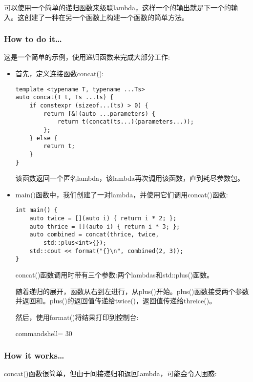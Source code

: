 
可以使用一个简单的递归函数来级联lambda，这样一个的输出就是下一个的输入。这创建了一种在另一个函数上构建一个函数的简单方法。

\subsubsection{How to do it…}

这是一个简单的示例，使用递归函数来完成大部分工作:

\begin{itemize}
\item 
首先，定义连接函数concat():

\begin{lstlisting}[style=styleCXX]
template <typename T, typename ...Ts>
auto concat(T t, Ts ...ts) {
	if constexpr (sizeof...(ts) > 0) {
		return [&](auto ...parameters) {
			return t(concat(ts...)(parameters...));
		};
	} else {
		return t;
	}
}
\end{lstlisting}

该函数返回一个匿名lambda，该lambda再次调用该函数，直到耗尽参数包。

\item 
main()函数中，我们创建了一对lambda，并使用它们调用concat()函数:

\begin{lstlisting}[style=styleCXX]
int main() {
	auto twice = [](auto i) { return i * 2; };
	auto thrice = [](auto i) { return i * 3; };
	auto combined = concat(thrice, twice,
		std::plus<int>{});
	std::cout << format("{}\n", combined(2, 3));
}
\end{lstlisting}

concat()函数调用时带有三个参数:两个lambdas和std::plus()函数。

随着递归的展开，函数从右到左进行，从plus()开始。plus()函数接受两个参数并返回和。plus()的返回值传递给twice()，返回值传递给threice()。

然后，使用format()将结果打印到控制台:

\begin{tcblisting}{commandshell={}}
30
\end{tcblisting}

\end{itemize}

\subsubsection{How it works…}

concat()函数很简单，但由于间接递归和返回lambda，可能会令人困惑:

